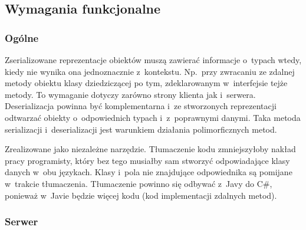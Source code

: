 \subsection{Wymagania funkcjonalne}

\subsubsection{Ogólne}

\begin{description}
Zserializowane reprezentacje obiektów muszą zawierać informacje o~typach wtedy, kiedy nie wynika ona jednoznacznie z~kontekstu.
Np.\ przy zwracaniu ze zdalnej metody obiektu klasy dziedziczącej po tym, zdeklarowanym w~interfejsie tejże metody.
To wymaganie dotyczy zarówno strony klienta jak i~serwera.
Deserializacja powinna być komplementarna i~ze stworzonych reprezentacji odtwarzać obiekty o~odpowiednich typach i~z~poprawnymi danymi.
Taka metoda serializacji i~deserializacji jest warunkiem działania polimorficznych metod.

Zrealizowane jako niezależne narzędzie.
Tłumaczenie kodu zmniejszyłoby nakład pracy programisty, który bez tego musiałby sam stworzyć odpowiadające klasy danych w~obu językach.
Klasy i~pola nie znajdujące odpowiednika są pomijane w~trakcie tłumaczenia.
Tłumaczenie powinno się odbywać z~Javy do C\#, ponieważ w~Javie będzie więcej kodu (kod implementacji zdalnych metod).
\end{description}

\subsubsection{Serwer}

